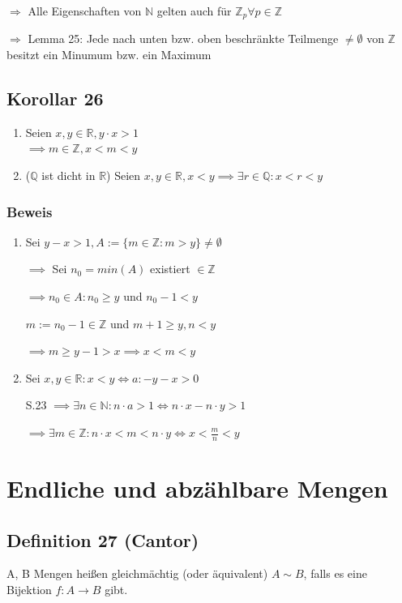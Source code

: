 \documentclass[fleqn]{scrbook}
\begin{document}
$\Rightarrow$ Alle Eigenschaften von $\mathbb{N}$ gelten auch für $\mathbb{Z}_p \forall p \in \mathbb{Z}$

$\Rightarrow$ Lemma 25: Jede nach unten bzw. oben beschränkte Teilmenge $\neq \emptyset$ von $\mathbb{Z}$ besitzt ein Minumum bzw. ein Maximum
\subsection{Korollar 26}
\begin{enumerate}[1)]
\item Seien $x,y \in \mathbb{R}, y \cdot x > 1$\\$\implies m\in\mathbb{Z}, x < m < y$
\item ($\mathbb{Q}$ ist dicht in $\mathbb{R}$) Seien $x,y \in \mathbb{R}, x < y \implies \exists r \in \mathbb{Q}: x < r <y$
\end{enumerate}
\subsubsection{Beweis} 
\begin{enumerate}[1)]
\item Sei $y - x > 1, A := \{ m \in \mathbb{Z}: m > y\} \neq \emptyset$

$\implies$ Sei $n_0 = min(A)$ existiert $\in \mathbb{Z}$

$\implies n_0 \in A: n_0 \geq y$ und $n_0 -1 < y$

$m:=n_0 -1 \in \mathbb{Z}$ und $m + 1 \geq y, n <y$

$\implies m \geq y -1 > x \implies x < m < y$

\item Sei $x,y \in \mathbb{R}: x < y \iff a: -y -x > 0$

S.23 $\implies \exists n \in \mathbb{N}: n  \cdot  a > 1 \iff n  \cdot  x - n  \cdot  y > 1$

$\implies \exists m \in \mathbb{Z}: n \cdot x<m<n \cdot y \iff x <\frac{m}{n} < y$
\end{enumerate}

\section{Endliche und abzählbare Mengen}

\subsection{Definition 27 (Cantor)} A, B Mengen heißen gleichmächtig (oder äquivalent) $A \sim B$, falls es eine Bijektion $f: A \rightarrow B$ gibt.
\end{document}
